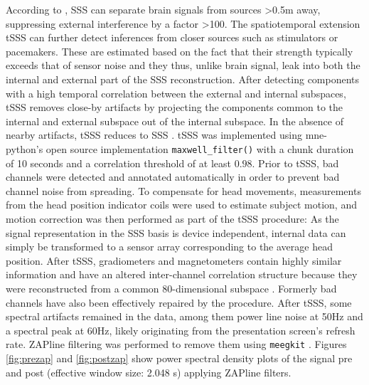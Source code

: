 According to \citet{taulu2006spatiotemporal}, \gls{SSS} can separate brain signals from sources >0.5m away, suppressing external interference by a factor >100.
The spatiotemporal extension \gls{tSSS} can further detect inferences from closer sources such as stimulators or pacemakers.
These are estimated based on the fact that their strength typically exceeds that of sensor noise and they thus, unlike brain signal, leak into both the internal and external part of the \gls{SSS} reconstruction.
After detecting components with a high temporal correlation between the external and internal subspaces, \gls{tSSS} removes close-by artifacts by projecting the components common to the internal and external subspace out of the internal subspace.
In the absence of nearby artifacts, \gls{tSSS} reduces to \gls{SSS} \citep{taulu2009removal}.
\gls{tSSS} was implemented using mne-python's open source implementation \texttt{maxwell\_filter()} with a chunk duration of 10 seconds and a correlation threshold of at least $0.98$.
Prior to \gls{tSSS}, bad channels were detected and annotated automatically in order to prevent bad channel noise from spreading.
To compensate for head movements, measurements from the head position indicator coils were used to estimate subject motion, and motion correction was then performed as part of the \gls{tSSS} procedure: As the signal representation in the \gls{SSS} basis is device independent, internal data can simply be transformed to a sensor array corresponding to the average head position.
After \gls{tSSS}, gradiometers and magnetometers contain highly similar information and have an altered inter-channel correlation structure because they were reconstructed from a common 80-dimensional subspace \citep{jas2018reproducible}.
Formerly bad channels have also been effectively repaired by the procedure.
After \gls{tSSS}, some spectral artifacts remained in the data, among them power line noise at 50Hz and a spectral peak at 60Hz, likely originating from the presentation screen's refresh rate.
ZAPline filtering \citep{de2020zapline} was performed to remove them using \texttt{meegkit} \citep{barascud2022}.
Figures \ref{fig:prezap} and \ref{fig:postzap} show power spectral density plots of the signal pre and post (effective window size: 2.048 s) applying ZAPline filters.


